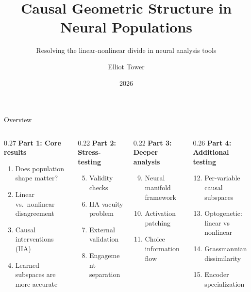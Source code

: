 \documentclass[aspectratio=169,11pt]{beamer}
\title{Causal Geometric Structure in Neural Populations}
\subtitle{Resolving the linear-nonlinear divide in neural analysis tools}
\author{Elliot Tower}
\date{2026}
\institute{}
\begin{document}
\maketitle

\begin{frame}{Overview}

\begin{columns}[T]
\begin{column}{0.27\textwidth}
\textbf{Part 1: Core results}
{\small
\begin{enumerate}
  \item Does population shape matter?
  \item Linear vs.\ nonlinear disagreement
  \item Causal interventions (IIA)
  \item Learned subspaces are more accurate
\end{enumerate}
}
\end{column}
\begin{column}{0.22\textwidth}
\textbf{Part 2: Stress-testing}
{\small
\begin{enumerate}
  \setcounter{enumi}{4}
  \item Validity checks
  \item IIA vacuity problem
  \item External validation
  \item Engagement separation
\end{enumerate}
}
\end{column}
\begin{column}{0.22\textwidth}
\textbf{Part 3: Deeper analysis}
{\small
\begin{enumerate}
  \setcounter{enumi}{8}
  \item Neural manifold framework
  \item Activation patching
  \item Choice information flow
\end{enumerate}
}
\end{column}
\begin{column}{0.26\textwidth}
\textbf{Part 4: Additional testing}
{\small
\begin{enumerate}
  \setcounter{enumi}{11}
  \item Per-variable causal subspaces
  \item Optogenetic: linear vs nonlinear
  \item Grassmannian dissimilarity
  \item Encoder specialization
\end{enumerate}
}
\end{column}
\end{columns}
\end{frame}
\end{document}
